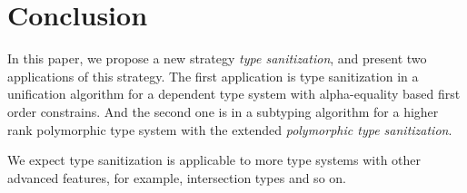 \section{Conclusion}

In this paper, we propose a new strategy \textit{type sanitization}, and present
two applications of this strategy. The first application is type sanitization in
a unification algorithm for a dependent type system with alpha-equality based
first order constrains. And the second one is in a subtyping algorithm for a
higher rank polymorphic type system with the extended \textit{polymorphic type
  sanitization}.

We expect type sanitization is applicable to more type systems with other
advanced features, for example, intersection types and so on.
